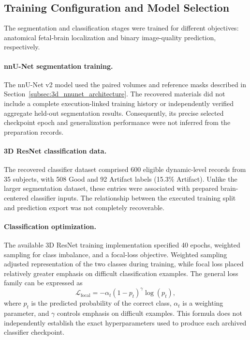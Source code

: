 \subsection{Training Configuration and Model Selection}
\label{subsec:3d_training_model_selection}

The segmentation and classification stages were trained for different objectives: anatomical fetal-brain localization and binary image-quality prediction, respectively.

\paragraph{nnU-Net segmentation training.}
The nnU-Net v2 model used the paired volumes and reference masks described in Section~\ref{subsec:3d_nnunet_architecture}. The recovered materials did not include a complete execution-linked training history or independently verified aggregate held-out segmentation results. Consequently, its precise selected checkpoint epoch and generalization performance were not inferred from the preparation records.

\paragraph{3D ResNet classification data.}
The recovered classifier dataset comprised 600 eligible dynamic-level records from 35 subjects, with 508 Good and 92 Artifact labels (15.3\% Artifact). Unlike the larger segmentation dataset, these entries were associated with prepared brain-centered classifier inputs. The relationship between the executed training split and prediction export was not completely recoverable.

\paragraph{Classification optimization.}
The available 3D ResNet training implementation specified 40 epochs, weighted sampling for class imbalance, and a focal-loss objective. Weighted sampling adjusted representation of the two classes during training, while focal loss placed relatively greater emphasis on difficult classification examples. The general loss family can be expressed as
\begin{equation}
\mathcal{L}_{\mathrm{focal}}=-\alpha_t(1-p_t)^\gamma\log(p_t),
\end{equation}
where $p_t$ is the predicted probability of the correct class, $\alpha_t$ is a weighting parameter, and $\gamma$ controls emphasis on difficult examples. This formula does not independently establish the exact hyperparameters used to produce each archived classifier checkpoint.

